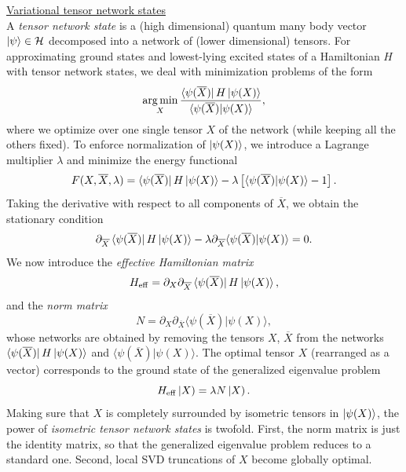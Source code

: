 \noindent \underline{Variational tensor network states} \\[0.5em]
\noindent A \textit{tensor network state} is a (high dimensional) quantum many body vector $\ket{\psi} \in \mathcal{H}$ decomposed into a network of (lower dimensional) tensors. For approximating ground states and lowest-lying excited states of a Hamiltonian $H$ with tensor network states, we deal with minimization problems of the form 
\begin{equation} \label{eq:optimization}
	\operatorname*{arg\,min}_{X} \frac{\bra{\psi(\overline{X})} H \ket{\psi(X)}}{\langle \psi(\overline{X}) \vert \psi(X) \rangle},
\end{equation}
where we optimize over one single tensor $X$ of the network (while keeping all the others fixed). To enforce normalization of $\ket{\psi(X)}$, we introduce a Lagrange multiplier $\lambda$ and minimize the energy functional 
\begin{equation} \label{eq:energy_functional}
	F(X, \overline{X}, \lambda) = \bra{\psi(\overline{X})} H \ket{\psi(X)} - \lambda \left[ \langle \psi(\overline{X}) \vert \psi(X) \rangle - 1 \right].
\end{equation}
Taking the derivative with respect to all components of $\overline{X}$, we obtain the stationary condition
\begin{equation} \label{eq:stationary_condition}
	\partial_{\overline{X}} \bra{\psi(\overline{X})} H \ket{\psi(X)} - \lambda \partial_{\overline{X}} \langle \psi(\overline{X}) \vert \psi(X) \rangle = 0.
\end{equation}
We now introduce the \textit{effective Hamiltonian matrix}
\begin{equation}
	H_{\mathrm{eff}} = \partial_{X} \partial_{\overline{X}} \bra{\psi(\overline{X})} H \ket{\psi(X)},
\end{equation}
and the \textit{norm matrix}
\begin{equation} \label{eq:norm_matrix}
	N = \partial_{X}\partial_{\overline{X}}  \langle \psi(\overline{X}) \vert \psi(X) \rangle,
\end{equation}
whose networks are obtained by removing the tensors $X$, $\overline{X}$ from the networks $\bra{\psi(\overline{X})} H \ket{\psi(X)}$ and $ \langle \psi(\overline{X}) \vert \psi(X) \rangle$. The optimal tensor $X$ (rearranged as a vector) corresponds to the ground state of the generalized eigenvalue problem
\begin{equation} \label{eq:effective_eigenvalue_equation}
	H_{\mathrm{eff}} \left| X \right) = \lambda N \left| X \right).
\end{equation}
Making sure that $X$ is completely surrounded by isometric tensors in $\ket{\psi(X)}$, the power of \textit{isometric tensor network states} is twofold. First, the norm matrix is just the identity matrix, so that the generalized eigenvalue problem reduces to a standard one. Second, local SVD truncations of $X$ become globally optimal. \\

